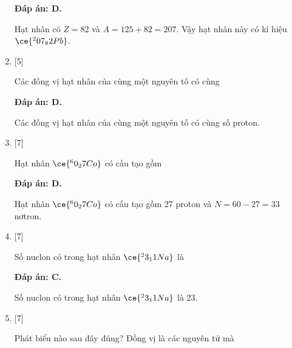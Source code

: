 \begin{enumerate}[label=\bfseries Câu \arabic*:]
	\loigiai
	{		\textbf{Đáp án: D.}
		
		Hạt nhân có $Z=82$ và $A=125+82=207$. Vậy hạt nhân này có kí hiệu $\ce{^207_82 Pb}$.
		
	}
	\item {} [5]
	\cauhoi
	{Các đồng vị hạt nhân của cùng một nguyên tố có cùng
	}
	
	\loigiai
	{		\textbf{Đáp án: D.}
		
		Các đồng vị hạt nhân của cùng một nguyên tố có cùng số proton.
		
	}
	\item {} [7]
	\cauhoi
	{Hạt nhân $\ce{^60_27 Co}$ có cấu tạo gồm
	}
	
	\loigiai
	{		\textbf{Đáp án: D.}
		
		Hạt nhân $\ce{^60_27 Co}$ có cấu tạo gồm 27 proton và $N=60-27=33$ nơtron.
		
	}
	\item {} [7]
	\cauhoi
	{Số nuclon có trong hạt nhân $\ce{^23_11 Na}$ là
	}
	
	\loigiai
	{		\textbf{Đáp án: C.}
		
		Số nuclon có trong hạt nhân $\ce{^23_11 Na}$ là 23.
		
	}
	\item {} [7]
	\cauhoi
	{Phát biểu nào sau đây đúng? Đồng vị là các nguyên tử mà
	}
	

\end{enumerate}
